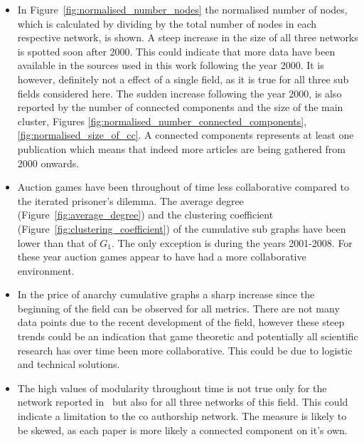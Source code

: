 \documentclass{article}
\theoremstyle{definition}
\begin{document}
\begin{itemize}
    \item In Figure~\ref{fig:normalised_number_nodes} the normalised number of nodes,
    which is calculated by dividing by the total number of nodes in each respective network,
    is shown. A steep increase in the size of all three networks is spotted soon after
    2000. This could indicate that more data have been available in the sources
    used in this work following the year 2000. It is however, definitely not a effect
    of a single field, as it is true for all three sub fields considered here.
    The sudden increase following the year 2000, is also reported by the
    number of connected components and the size of the main cluster, Figures
    \ref{fig:normalised_number_connected_components}, \ref{fig:normalised_size_of_cc}.
    A connected components represents at least one publication which means that indeed
    more articles are being gathered from 2000 onwards.
    \item Auction games have been throughout of time less collaborative compared
    to the iterated prisoner's dilemma. The average degree (Figure~\ref{fig:average_degree})
    and the clustering coefficient (Figure~\ref{fig:clustering_coefficient}) of 
    the cumulative sub graphs have been lower than that of \(G_1\).
    The only exception is during the years 2001-2008. For these
    year auction games appear to have had a more collaborative environment.
    \item In the price of anarchy cumulative graphs a sharp increase since the 
    beginning of the field can be observed for all metrics. There are not
    many data points due to the recent development of the field, however
    these steep trends could be an indication that game theoretic and potentially
    all scientific research has over time been more collaborative. This could
    be due to logistic and technical solutions.
    \item The high values of modularity throughout time is not true only for the
    network reported in~\cite{Liu2015} but also for all three networks of this
    field. This could indicate a limitation to the co authorship network. The
    measure is likely to be skewed, as each paper is more likely a connected
    component on it's own.
\end{itemize}
\end{document}

